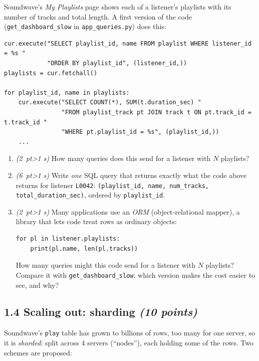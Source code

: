 \documentclass[11pt]{article}
\newcommand{\code}[1]{\texttt{#1}}
\newcommand{\pts}[1]{\hfill\textit{(#1 points)}}
\newcommand{\pt}[1]{\textit{(#1~pt\ifnum#1>1 s\fi)}}
\begin{document}
Soundwave's \emph{My Playlists} page shows each of a listener's playlists with
its number of tracks and total length. A first version of the code
(\code{get\_dashboard\_slow} in \code{app\_queries.py}) does this:

\begin{lstlisting}[style=py]
cur.execute("SELECT playlist_id, name FROM playlist WHERE listener_id = %s "
            "ORDER BY playlist_id", (listener_id,))
playlists = cur.fetchall()

for playlist_id, name in playlists:
    cur.execute("SELECT COUNT(*), SUM(t.duration_sec) "
                "FROM playlist_track pt JOIN track t ON pt.track_id = t.track_id "
                "WHERE pt.playlist_id = %s", (playlist_id,))
    ...
\end{lstlisting}

\begin{enumerate}[label=(\alph*)]
  \item \pt{2} How many queries does this send for a listener with $N$ playlists?

  \item \pt{6} Write \emph{one} SQL query that returns exactly what the code
  above returns for listener \code{L0042}:
  \code{(playlist\_id, name, num\_tracks, total\_duration\_sec)}, ordered by
  \code{playlist\_id}. 

  \item \pt{2} Many applications use an \emph{ORM} (object-relational mapper),
  a library that lets code treat rows as ordinary objects:
\begin{lstlisting}[style=py]
for pl in listener.playlists:
    print(pl.name, len(pl.tracks))
\end{lstlisting}
  How many queries might this code send for a listener with $N$ playlists?
  Compare it with \code{get\_dashboard\_slow}: which version makes the cost
  easier to see, and why?
\end{enumerate}

\subsection*{1.4 Scaling out: sharding \pts{10}}

Soundwave's \code{play} table has grown to billions of rows, too many for one
server, so it is \emph{sharded}: split across 4 servers (``nodes''), each
holding some of the rows. Two schemes are proposed:
\end{document}
